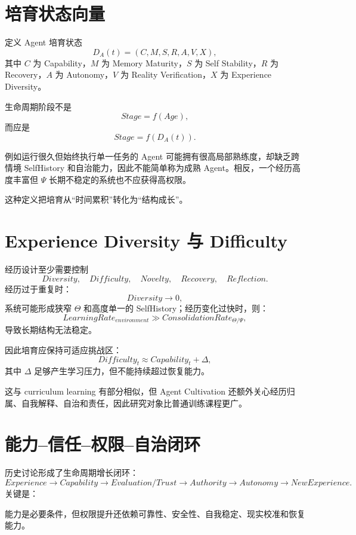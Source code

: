 \section{培育状态向量}

定义 Agent 培育状态
\[
D_A(t)
=
(
C,
M,
S,
R,
A,
V,
X
),
\]
其中 $C$ 为 Capability，$M$ 为 Memory Maturity，$S$ 为 Self Stability，$R$ 为 Recovery，$A$ 为 Autonomy，$V$ 为 Reality Verification，$X$ 为 Experience Diversity。

生命周期阶段不是
\[
Stage=f(Age),
\]
而应是
\[
Stage
=
f(D_A(t)).
\]

例如运行很久但始终执行单一任务的 Agent 可能拥有很高局部熟练度，却缺乏跨情境 SelfHistory 和自治能力，因此不能简单称为成熟 Agent。相反，一个经历高度丰富但 $\Psi$ 长期不稳定的系统也不应获得高权限。

这种定义把培育从“时间累积”转化为“结构成长”。

\section{Experience Diversity 与 Difficulty}

经历设计至少需要控制
\[
Diversity,\quad
Difficulty,\quad
Novelty,\quad
Recovery,\quad
Reflection.
\]
经历过于重复时：
\[
Diversity\rightarrow0,
\]
系统可能形成狭窄 $\Theta$ 和高度单一的 SelfHistory；经历变化过快时，则：
\[
LearningRate_{environment}
\gg
ConsolidationRate_{\Theta/\Psi},
\]
导致长期结构无法稳定。

因此培育应保持可适应挑战区：
\[
Difficulty_t
\approx
Capability_t+\Delta,
\]
其中 $\Delta$ 足够产生学习压力，但不能持续超过恢复能力。

这与 curriculum learning 有部分相似，但 Agent Cultivation 还额外关心经历归属、自我解释、自治和责任，因此研究对象比普通训练课程更广。

\section{能力--信任--权限--自治闭环}

历史讨论形成了生命周期增长闭环：
\[
Experience
\rightarrow
Capability
\rightarrow
Evaluation/Trust
\rightarrow
Authority
\rightarrow
Autonomy
\rightarrow
NewExperience.
\]
关键是：
\begin{statementbox}
\centering
{}
\end{statementbox}
能力是必要条件，但权限提升还依赖可靠性、安全性、自我稳定、现实校准和恢复能力。

